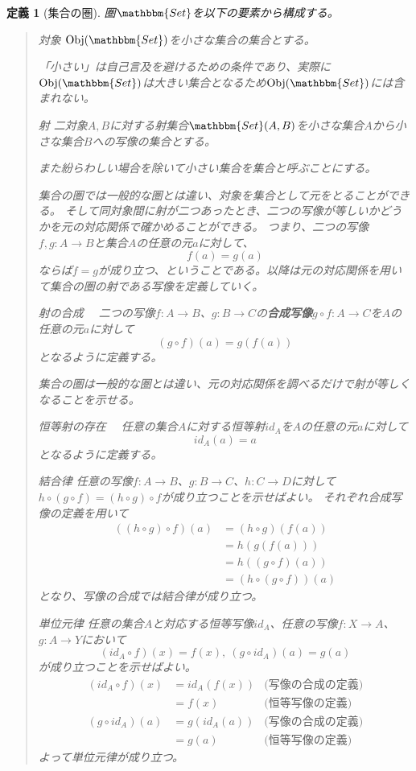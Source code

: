 \documentclass[uplatex,dvipdfmx]{jsarticle}
\newcommand{\cat}[1]{\mathbbm{#1}}
\newcommand{\arrow}{\rightarrow}
\newcommand{\obj}[1]{\mathrm{Obj}(\cat{#1})}
\newcommand{\mor}[3]{#1:#2\arrow #3}
\newcommand{\arset}[3]{\cat{#1}(#2,#3)}
\newtheorem{define}[proof]{定義}
\numberwithin{proof}{subsection}
\newenvironment{mydescription}
{\begin{description}
  \setlength{\parskip}{0.5cm}
}
{\end{description}}
\begin{document}
	\begin{define}[集合の圏]
		圏$\cat{Set}$を以下の要素から構成する。
		\begin{quote}
			\begin{mydescription}
				\item[対象] $\obj{Set}$を小さな集合の集合とする。

				「小さい」は自己言及を避けるための条件であり、実際に$\obj{Set}$は大きい集合となるため$\obj{Set}$には含まれない。
				\item[射] 二対象$A,B$に対する射集合$\arset{Set}{A}{B}$を小さな集合$A$から小さな集合$B$への写像の集合とする。

				また紛らわしい場合を除いて小さい集合を集合と呼ぶことにする。

				集合の圏では一般的な圏とは違い、対象を集合として元をとることができる。
				そして同対象間に射が二つあったとき、二つの写像が等しいかどうかを元の対応関係で確かめることができる。
				つまり、二つの写像$\mor{f,g}{A}{B}$と集合$A$の任意の元$a$に対して、\[f(a)=g(a)\]ならば$f=g$が成り立つ、ということである。以降は元の対応関係を用いて集合の圏の射である写像を定義していく。

				\item[射の合成] 　二つの写像$\mor{f}{A}{B}$、$\mor{g}{B}{C}$の\textbf{合成写像}$\mor{g\circ f}{A}{C}$を$A$の任意の元$a$に対して\[(g\circ f)(a)=g(f(a))\]となるように定義する。

				集合の圏は一般的な圏とは違い、元の対応関係を調べるだけで射が等しくなることを示せる。
				\item[恒等射の存在]　任意の集合$A$に対する恒等射$id_A$を$A$の任意の元$a$に対して\[id_A(a)=a\]となるように定義する。
				\item[結合律] 任意の写像$\mor{f}{A}{B}$、$\mor{g}{B}{C}$、$\mor{h}{C}{D}$に対して$h\circ(g\circ f)=(h\circ g)\circ f$が成り立つことを示せばよい。
				それぞれ合成写像の定義を用いて
				\begin{align*}
					((h\circ g)\circ f)(a)&=(h\circ g)(f(a))\\
					&=h(g(f(a)))\\
					&=h((g\circ f)(a))\\
					&=(h\circ(g\circ f))(a)
				\end{align*}
				となり、写像の合成では結合律が成り立つ。
				\item[単位元律] 任意の集合$A$と対応する恒等写像$id_A$、任意の写像$\mor{f}{X}{A}$、$\mor{g}{A}{Y}$において\[(id_A\circ f)(x)=f(x),\ (g\circ id_A)(a)=g(a)\]が成り立つことを示せばよい。
				\begin{align*}
					(id_A\circ f)(x)&=id_A(f(x))&\text{(写像の合成の定義)}\\
					&=f(x)&\text{{(恒等写像の定義)}}\\
					(g\circ id_A)(a)&=g(id_A(a))&\text{(写像の合成の定義)}\\
					&=g(a)&\text{{(恒等写像の定義)}}
				\end{align*}
				よって単位元律が成り立つ。
			\end{mydescription}
		\end{quote}
	\end{define}
	
\end{document}
